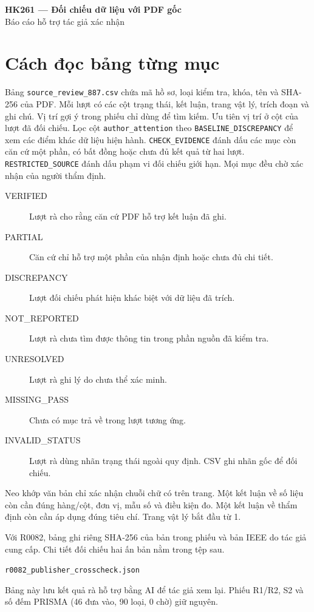 \documentclass[10pt,a4paper]{article}
\begin{document}
\begin{center}
{\Large\bfseries HK261 — Đối chiếu dữ liệu với PDF gốc}\\[4pt]
{Báo cáo hỗ trợ tác giả xác nhận}
\end{center}

\section*{Cách đọc bảng từng mục}
Bảng \texttt{source\_review\_887.csv} chứa mã hồ sơ, loại kiểm tra, khóa, tên và SHA-256
của PDF. Mỗi lượt có các cột trạng thái, kết luận, trang vật lý, trích đoạn và ghi chú.
Vị trí gợi ý trong phiếu chỉ dùng để tìm kiếm. Ưu tiên vị trí ở cột của lượt đã đối chiếu.
Lọc cột \texttt{author\_attention} theo \texttt{BASELINE\_DISCREPANCY} để xem các điểm
khác dữ liệu hiện hành. \texttt{CHECK\_EVIDENCE} đánh dấu các mục còn căn cứ một phần,
có bất đồng hoặc chưa đủ kết quả từ hai lượt. \texttt{RESTRICTED\_SOURCE} đánh dấu phạm
vi đối chiếu giới hạn. Mọi mục đều chờ xác nhận của người thẩm định.
\begin{description}
\item[VERIFIED] Lượt rà cho rằng căn cứ PDF hỗ trợ kết luận đã ghi.
\item[PARTIAL] Căn cứ chỉ hỗ trợ một phần của nhận định hoặc chưa đủ chi tiết.
\item[DISCREPANCY] Lượt đối chiếu phát hiện khác biệt với dữ liệu đã trích.
\item[NOT\_REPORTED] Lượt rà chưa tìm được thông tin trong phần nguồn đã kiểm tra.
\item[UNRESOLVED] Lượt rà ghi lý do chưa thể xác minh.
\item[MISSING\_PASS] Chưa có mục trả về trong lượt tương ứng.
\item[INVALID\_STATUS] Lượt rà dùng nhãn trạng thái ngoài quy định. CSV ghi nhãn gốc để đối chiếu.
\end{description}
Neo khớp văn bản chỉ xác nhận chuỗi chữ có trên trang. Một kết luận về số liệu còn
cần đúng hàng/cột, đơn vị, mẫu số và điều kiện đo. Một kết luận về thẩm định
còn cần áp dụng đúng tiêu chí. Trang vật lý bắt đầu từ 1.

Với R0082, bảng ghi riêng SHA-256 của bản trong phiếu và bản IEEE do tác giả cung cấp.
Chi tiết đối chiếu hai ấn bản nằm trong tệp sau.

\texttt{r0082\_publisher\_crosscheck.json}

Bảng này lưu kết quả rà hỗ trợ bằng AI để tác giả xem lại. Phiếu R1/R2, S2
và số đếm PRISMA (46 đưa vào, 90 loại, 0 chờ) giữ nguyên.
\end{document}
